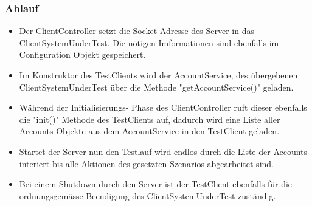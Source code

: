\subsubsection{Ablauf}
\label{sec:ablauf}
\begin{itemize}
\item Der ClientController setzt die Socket Adresse des Server in das Client\-System\-Under\-Test. Die nötigen Imformationen sind ebenfalls im Configuration Objekt gespeichert.
\item Im Konstruktor des TestClients wird der AccountService, des über\-gebenen ClientSystemUnderTest über die Meth\-ode "getAccountService()" geladen. 
\item Während der Initialisierungs- Phase des ClientController ruft dieser ebenfalls die "init()" Methode des TestClients auf, dadurch wird eine Liste aller Accounts Objekte aus dem AccountService in den TestClient geladen.
\item Startet der Server nun den Testlauf wird endlos durch die Liste der Accounts interiert bis alle Aktionen des gesetzten Szenarios abgearbeitet sind.
\item Bei einem Shutdown durch den Server ist der TestClient ebenfalls für die ord\-nungs\-ge\-mä\-sse Be\-en\-di\-gung des ClientSystemUnderTest zu\-stän\-dig.
\end{itemize}


